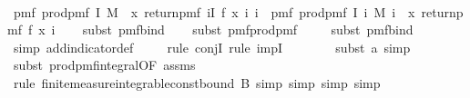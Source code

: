 \begin{isabellebody}
\isanewline
\ \ \isamarkupfalse%
\ {\isachardoublequoteopen}pmf\ {\isacharparenleft}{\kern0pt}prod{\isacharunderscore}{\kern0pt}pmf\ I\ M\ {\isasymbind}\ {\isacharparenleft}{\kern0pt}{\isasymlambda}x{\isachardot}{\kern0pt}\ return{\isacharunderscore}{\kern0pt}pmf\ {\isacharparenleft}{\kern0pt}{\isasymlambda}i{\isasymin}I{\isachardot}{\kern0pt}\ f\ {\isacharparenleft}{\kern0pt}x\ i{\isacharparenright}{\kern0pt}{\isacharparenright}{\kern0pt}{\isacharparenright}{\kern0pt}{\isacharparenright}{\kern0pt}\ i\ {\isacharequal}{\kern0pt}\ pmf\ {\isacharparenleft}{\kern0pt}prod{\isacharunderscore}{\kern0pt}pmf\ I\ {\isacharparenleft}{\kern0pt}{\isasymlambda}i{\isachardot}{\kern0pt}\ M\ i\ {\isasymbind}\ {\isacharparenleft}{\kern0pt}{\isasymlambda}x{\isachardot}{\kern0pt}\ return{\isacharunderscore}{\kern0pt}pmf\ {\isacharparenleft}{\kern0pt}f\ x{\isacharparenright}{\kern0pt}{\isacharparenright}{\kern0pt}{\isacharparenright}{\kern0pt}{\isacharparenright}{\kern0pt}\ i{\isachardoublequoteclose}\isanewline
\ \ \isamarkupfalse%
\ {\isacharparenleft}{\kern0pt}subst\ pmf{\isacharunderscore}{\kern0pt}bind{\isacharparenright}{\kern0pt}\isanewline
\ \ \isamarkupfalse%
\ {\isacharparenleft}{\kern0pt}subst\ pmf{\isacharunderscore}{\kern0pt}prod{\isacharunderscore}{\kern0pt}pmf{\isacharparenright}{\kern0pt}\ \isamarkupfalse%
\isanewline
\ \ \isamarkupfalse%
\ {\isacharparenleft}{\kern0pt}subst\ pmf{\isacharunderscore}{\kern0pt}bind{\isacharparenright}{\kern0pt}\isanewline
\ \ \ \isamarkupfalse%
\ {\isacharparenleft}{\kern0pt}simp\ add{\isacharcolon}{\kern0pt}indicator{\isacharunderscore}{\kern0pt}def{\isacharparenright}{\kern0pt}\isanewline
\ \ \ \isamarkupfalse%
\ {\isacharparenleft}{\kern0pt}rule\ conjI{\isacharcomma}{\kern0pt}\ rule\ impI{\isacharparenright}{\kern0pt}\isanewline
\ \ \ \ \ \ \isamarkupfalse%
\ {\isacharparenleft}{\kern0pt}subst\ a{\isacharcomma}{\kern0pt}\ simp{\isacharparenright}{\kern0pt}\isanewline
\ \ \ \ \ \ \isamarkupfalse%
\ {\isacharparenleft}{\kern0pt}subst\ prod{\isacharunderscore}{\kern0pt}pmf{\isacharunderscore}{\kern0pt}integral{\isacharbrackleft}{\kern0pt}OF\ assms{\isacharparenleft}{\kern0pt}{}{\isacharparenright}{\kern0pt}{\isacharbrackright}{\kern0pt}{\isacharparenright}{\kern0pt}\isanewline
\ \ \ \ \ \ \ \isamarkupfalse%
\ {\isacharparenleft}{\kern0pt}rule\ finite{\isacharunderscore}{\kern0pt}measure{\isachardot}{\kern0pt}integrable{\isacharunderscore}{\kern0pt}const{\isacharunderscore}{\kern0pt}bound{\isacharbrackleft}{\kern0pt}\ B{\isacharequal}{\kern0pt}{\isachardoublequoteopen}{}{\isachardoublequoteclose}{\isacharbrackright}{\kern0pt}{\isacharcomma}{\kern0pt}\ simp{\isacharcomma}{\kern0pt}\ simp{\isacharcomma}{\kern0pt}\ simp{\isacharcomma}{\kern0pt}\ simp{\isacharparenright}{\kern0pt}\isanewline

\end{isabellebody}
